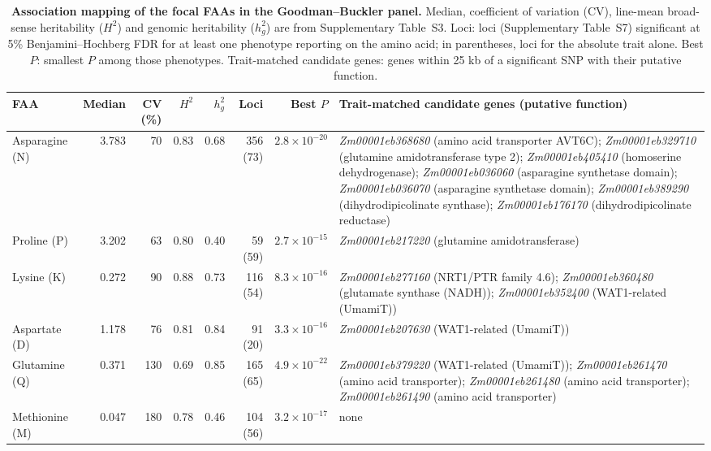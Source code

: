 \begin{table}[t]
\centering
\caption{\textbf{Association mapping of the focal FAAs in the Goodman--Buckler panel.} Median, coefficient of variation (CV), line-mean broad-sense heritability ($H^2$) and genomic heritability ($h^2_g$) are from Supplementary Table~S3. Loci: loci (Supplementary Table~S7) significant at 5\% Benjamini--Hochberg FDR for at least one phenotype reporting on the amino acid; in parentheses, loci for the absolute trait alone. Best $P$: smallest $P$ among those phenotypes. Trait-matched candidate genes: genes within 25 kb of a significant SNP with their putative function.}
\label{tab:amino_gwas_focus}
\footnotesize
\setlength{\tabcolsep}{3pt}
\begin{tabularx}{\textwidth}{@{}l r r r r r r >{\raggedright\arraybackslash}X@{}}
\hline
FAA & Median & CV (\%) & $H^2$ & $h^2_g$ & Loci & Best $P$ & Trait-matched candidate genes (putative function) \\
\hline
Asparagine (N) & 3.783 & 70 & 0.83 & 0.68 & 356 (73) & $2.8\times10^{-20}$ & \textit{Zm00001eb368680} (amino acid transporter AVT6C); \textit{Zm00001eb329710} (glutamine amidotransferase type 2); \textit{Zm00001eb405410} (homoserine dehydrogenase); \textit{Zm00001eb036060} (asparagine synthetase domain); \textit{Zm00001eb036070} (asparagine synthetase domain); \textit{Zm00001eb389290} (dihydrodipicolinate synthase); \textit{Zm00001eb176170} (dihydrodipicolinate reductase) \\
Proline (P) & 3.202 & 63 & 0.80 & 0.40 & 59 (59) & $2.7\times10^{-15}$ & \textit{Zm00001eb217220} (glutamine amidotransferase) \\
Lysine (K) & 0.272 & 90 & 0.88 & 0.73 & 116 (54) & $8.3\times10^{-16}$ & \textit{Zm00001eb277160} (NRT1/PTR family 4.6); \textit{Zm00001eb360480} (glutamate synthase (NADH)); \textit{Zm00001eb352400} (WAT1-related (UmamiT)) \\
Aspartate (D) & 1.178 & 76 & 0.81 & 0.84 & 91 (20) & $3.3\times10^{-16}$ & \textit{Zm00001eb207630} (WAT1-related (UmamiT)) \\
Glutamine (Q) & 0.371 & 130 & 0.69 & 0.85 & 165 (65) & $4.9\times10^{-22}$ & \textit{Zm00001eb379220} (WAT1-related (UmamiT)); \textit{Zm00001eb261470} (amino acid transporter); \textit{Zm00001eb261480} (amino acid transporter); \textit{Zm00001eb261490} (amino acid transporter) \\
Methionine (M) & 0.047 & 180 & 0.78 & 0.46 & 104 (56) & $3.2\times10^{-17}$ & none \\
\hline
\end{tabularx}
\end{table}

